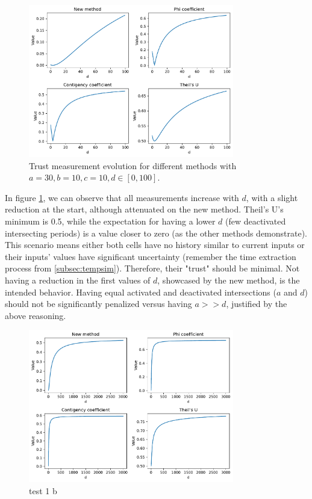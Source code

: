 \begin{figure}[h!]
\centering
    \includegraphics[width=0.8\textwidth]{figures/chapter4/cell/trust_tests/1_a.pdf}
    \caption{Trust measurement evolution for different methods with $a=30, b=10, c=10, d \in [0, 100]$.}
    \label{fig:trust_test_1_a}
\end{figure}
\FloatBarrier


In figure \ref{fig:trust_test_1_a}, we can observe that all measurements increase with $d$, with a slight reduction at the start, although attenuated on the new method. Theil's U's minimum is 0.5, while the expectation for having a lower $d$ (few deactivated intersecting periods) is a value closer to zero (as the other methods demonstrate). This scenario means either both cells have no history similar to current inputs or their inputs' values have significant uncertainty (remember the time extraction process from \ref{subsec:tempsim}). Therefore, their "trust" should be minimal.
Not having a reduction in the first values of $d$, showcased by the new method, is the intended behavior. Having equal activated and deactivated intersections ($a$ and $d$) should not be significantly penalized versus having $a>>d$, justified by the above reasoning.

\begin{figure}[h!]
\centering
    \includegraphics[width=0.8\textwidth]{figures/chapter4/cell/trust_tests/1_b.pdf}
    \caption{test 1 b}
    \label{fig:trust_test_1_b}
\end{figure}
\FloatBarrier

